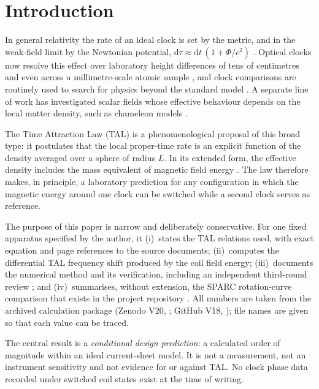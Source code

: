 \documentclass[12pt,a4paper]{article}
\newcommand{\dd}{\mathrm{d}}
\begin{document}
\section{Introduction}\label{sec:intro}

In general relativity the rate of an ideal clock is set by the metric, and in the weak-field limit by
the Newtonian potential, $\dd\tau\approx\dd t\,(1+\Phi/c^2)$ \cite{Will2014}. Optical clocks now resolve
this effect over laboratory height differences of tens of centimetres \cite{Chou2010} and even across
a millimetre-scale atomic sample \cite{Bothwell2022,Zheng2022}, and clock comparisons are routinely
used to search for physics beyond the standard model \cite{Safronova2018,Hees2016}. A separate line of
work has investigated scalar fields whose effective behaviour depends on the local matter density,
such as chameleon models \cite{Khoury2004,Burrage2018}.

The Time Attraction Law (TAL) \cite{TAL_formalism,TAL_publikacio} is a phenomenological proposal of
this broad type: it postulates that the local proper-time rate is an explicit function of the
density averaged over a sphere of radius $L$. In its extended form, the effective density includes the
mass equivalent of magnetic field energy \cite{TAL_publikacio}. The law therefore makes, in principle,
a laboratory prediction for any configuration in which the magnetic energy around one clock can be
switched while a second clock serves as reference.

The purpose of this paper is narrow and deliberately conservative. For one fixed apparatus specified by
the author, it (i)~states the TAL relations used, with exact equation and page references to the source
documents; (ii)~computes the differential TAL frequency shift produced by the coil field energy; (iii)~documents
the numerical method and its verification, including an independent third-round review
\cite{TAL_V20}; and (iv)~summarises, without extension, the SPARC rotation-curve comparison that exists in
the project repository \cite{TAL_repo,TAL_V19,Lelli2016}. All numbers are taken from the archived
calculation package (Zenodo V20, \cite{TAL_V20}; GitHub V18, \cite{TAL_repo}); file names are given so that
each value can be traced.

The central result is a \emph{conditional design prediction}: a calculated order of magnitude within an
ideal current-sheet model. It is not a measurement, not an instrument sensitivity and not evidence for
or against TAL. No clock phase data recorded under switched coil states exist at the time of writing.
\end{document}
